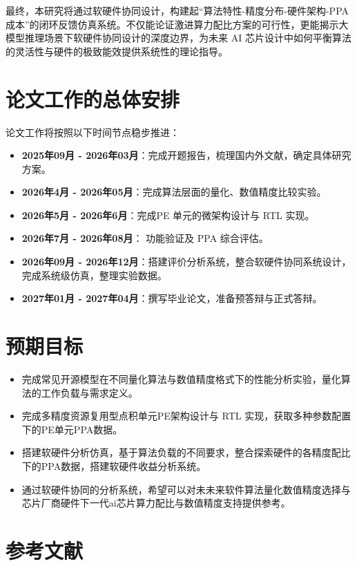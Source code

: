 \documentclass[10.5pt,compsoc,UTF8]{CjC}
\theoremstyle{mystyle}
\begin{document}
最终，本研究将通过软硬件协同设计，构建起“算法特性-精度分布-硬件架构-PPA成本”的闭环反馈仿真系统。不仅能论证激进算力配比方案的可行性，更能揭示大模型推理场景下软硬件协同设计的深度边界，为未来 AI 芯片设计中如何平衡算法的灵活性与硬件的极致能效提供系统性的理论指导。

\section{论文工作的总体安排}
论文工作将按照以下时间节点稳步推进：
\begin{itemize}
    \item \textbf{2025年09月 - 2026年03月}：完成开题报告，梳理国内外文献，确定具体研究方案。
    \item \textbf{2026年4月 - 2026年05月}：完成算法层面的量化、数值精度比较实验。
    \item \textbf{2026年5月 - 2026年6月}：完成PE 单元的微架构设计与 RTL 实现。
    \item \textbf{2026年7月 - 2026年08月}： 功能验证及 PPA 综合评估。
    \item \textbf{2026年09月 - 2026年12月}：搭建评价分析系统，整合软硬件协同系统设计，完成系统级仿真，整理实验数据。
    \item \textbf{2027年01月 - 2027年04月}：撰写毕业论文，准备预答辩与正式答辩。
\end{itemize}

\section{预期目标}
\begin{itemize}
    \item 完成常见开源模型在不同量化算法与数值精度格式下的性能分析实验，量化算法的工作负载与需求定义。
    \item 完成多精度资源复用型点积单元PE架构设计与 RTL 实现，获取多种参数配置下的PE单元PPA数据。
    \item 搭建软硬件分析仿真，基于算法负载的不同要求，整合探索硬件的各精度配比下的PPA数据，搭建软硬件收益分析系统。
    \item 通过软硬件协同的分析系统，希望可以对未未来软件算法量化数值精度选择与芯片厂商硬件下一代ai芯片算力配比与数值精度支持提供参考。
\end{itemize}







\newpage 
\section{参考文献}
\begingroup
    \setlength{\bibsep}{0pt} 
     
     
\endgroup


\vspace {10mm}


\end{document}

